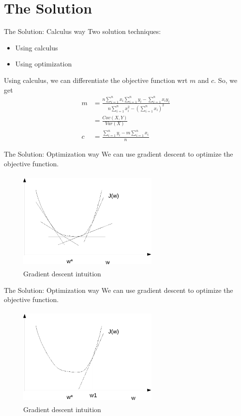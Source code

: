 \documentclass[blue]{beamer}
\begin{document}
\section{The Solution}

\begin{frame}{The Solution: Calculus way}
Two solution techniques:
\begin{itemize}
\item Using calculus
\item Using optimization

\end{itemize}
Using calculus, we can differentiate the objective function wrt $m$ and $c$. So, we get
\begin{align*}
m &= \frac{ n\sum_{i=1}^n x_i\sum_{i=1}^ny_i-\sum_{i=1}^n x_iy_i}{n\sum_{i=1}^n x_i^2- (\sum_{i=1}^nx_i)^2} \\
&=\frac{ Cov(X,Y)}{Var(X)} 
\\
c &=\frac{\sum_{i=1}^ny_i -m \sum_{i=1}^n x_i}{n}
\end{align*}
\end{frame}

\begin{frame}{The Solution: Optimization way}
We can use gradient descent to optimize the objective function.
\begin{figure}
\centering
\includegraphics[width=7cm,height=5cm]{gd1-crop.pdf}
\caption{Gradient descent intuition}
\label{linear}
\end{figure}
\end{frame}

\begin{frame}{The Solution: Optimization way}
We can use gradient descent to optimize the objective function.
\begin{figure}
\centering
\includegraphics[width=7cm,height=5cm]{linearapprox-crop.pdf}
\caption{Gradient descent intuition}
\label{linear}
\end{figure}
\end{frame}
\end{document}
